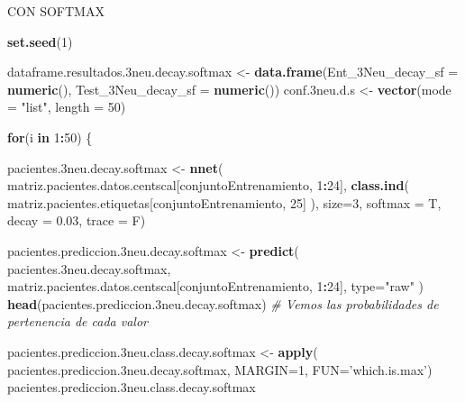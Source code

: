 \documentclass[]{article}
\newenvironment{Shaded}{\begin{snugshade}}{\end{snugshade}}
\newcommand{\CommentTok}[1]{\textcolor[rgb]{0.56,0.35,0.01}{\textit{#1}}}
\newcommand{\ControlFlowTok}[1]{\textcolor[rgb]{0.13,0.29,0.53}{\textbf{#1}}}
\newcommand{\DataTypeTok}[1]{\textcolor[rgb]{0.13,0.29,0.53}{#1}}
\newcommand{\DecValTok}[1]{\textcolor[rgb]{0.00,0.00,0.81}{#1}}
\newcommand{\FloatTok}[1]{\textcolor[rgb]{0.00,0.00,0.81}{#1}}
\newcommand{\KeywordTok}[1]{\textcolor[rgb]{0.13,0.29,0.53}{\textbf{#1}}}
\newcommand{\NormalTok}[1]{#1}
\newcommand{\OperatorTok}[1]{\textcolor[rgb]{0.81,0.36,0.00}{\textbf{#1}}}
\newcommand{\StringTok}[1]{\textcolor[rgb]{0.31,0.60,0.02}{#1}}
\begin{document}
CON SOFTMAX

\begin{Shaded}
\begin{Highlighting}[]
\KeywordTok{set.seed}\NormalTok{(}\DecValTok{1}\NormalTok{)}

\NormalTok{dataframe.resultados}\FloatTok{.3}\NormalTok{neu.decay.softmax <-}\StringTok{ }\KeywordTok{data.frame}\NormalTok{(}\DataTypeTok{Ent_3Neu_decay_sf =} \KeywordTok{numeric}\NormalTok{(),}
                                                      \DataTypeTok{Test_3Neu_decay_sf =} \KeywordTok{numeric}\NormalTok{())}
\NormalTok{conf}\FloatTok{.3}\NormalTok{neu.d.s <-}\StringTok{ }\KeywordTok{vector}\NormalTok{(}\DataTypeTok{mode =} \StringTok{"list"}\NormalTok{, }\DataTypeTok{length =} \DecValTok{50}\NormalTok{)}

\ControlFlowTok{for}\NormalTok{(i }\ControlFlowTok{in} \DecValTok{1}\OperatorTok{:}\DecValTok{50}\NormalTok{)}
\NormalTok{\{}

\NormalTok{  pacientes}\FloatTok{.3}\NormalTok{neu.decay.softmax <-}\StringTok{ }\KeywordTok{nnet}\NormalTok{( matriz.pacientes.datos.centscal[conjuntoEntrenamiento, }\DecValTok{1}\OperatorTok{:}\DecValTok{24}\NormalTok{],}
                                        \KeywordTok{class.ind}\NormalTok{( matriz.pacientes.etiquetas[conjuntoEntrenamiento, }\DecValTok{25}\NormalTok{] ),}
                                        \DataTypeTok{size=}\DecValTok{3}\NormalTok{, }
                                        \DataTypeTok{softmax =}\NormalTok{ T,}
                                        \DataTypeTok{decay =} \FloatTok{0.03}\NormalTok{, }
                                        \DataTypeTok{trace =}\NormalTok{ F)}
  
\NormalTok{  pacientes.prediccion}\FloatTok{.3}\NormalTok{neu.decay.softmax <-}\StringTok{ }\KeywordTok{predict}\NormalTok{( pacientes}\FloatTok{.3}\NormalTok{neu.decay.softmax, matriz.pacientes.datos.centscal[conjuntoEntrenamiento, }\DecValTok{1}\OperatorTok{:}\DecValTok{24}\NormalTok{], }\DataTypeTok{type=}\StringTok{"raw"}\NormalTok{ )}
  \KeywordTok{head}\NormalTok{(pacientes.prediccion}\FloatTok{.3}\NormalTok{neu.decay.softmax) }\CommentTok{# Vemos las probabilidades de pertenencia de cada valor}
  
  
\NormalTok{  pacientes.prediccion}\FloatTok{.3}\NormalTok{neu.class.decay.softmax <-}\StringTok{ }\KeywordTok{apply}\NormalTok{( pacientes.prediccion}\FloatTok{.3}\NormalTok{neu.decay.softmax, }\DataTypeTok{MARGIN=}\DecValTok{1}\NormalTok{, }\DataTypeTok{FUN=}\StringTok{'which.is.max'}\NormalTok{)}
\NormalTok{  pacientes.prediccion}\FloatTok{.3}\NormalTok{neu.class.decay.softmax}
  

\end{Highlighting}
\end{Shaded}
\end{document}
